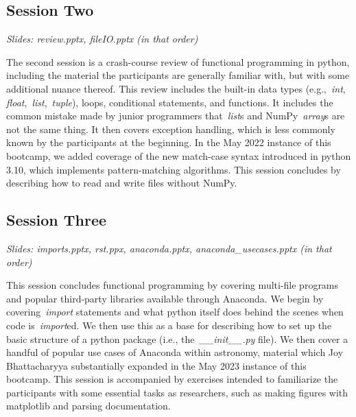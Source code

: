 \subsection{Session Two}
\label{sec:curriculum:two}
\noindent
\textit{Slides: review.pptx, fileIO.pptx (in that order)}
\par\noindent
The second session is a crash-course review of functional programming in
python, including the material the participants are generally familiar with,
but with some additional nuance thereof.
This review includes the built-in data types (e.g.,~\textit{int},
\textit{float},~\textit{list},~\textit{tuple}), loops, conditional statements,
and functions.
It includes the common mistake made by junior programmers that~\textit{list}s
and NumPy~\textit{array}s are not the same thing.
It then covers exception handling, which is less commonly known by the
participants at the beginning.
In the May 2022 instance of this bootcamp, we added coverage of the new
match-case syntax introduced in python 3.10, which implements pattern-matching
algorithms.
This session concludes by describing how to read and write files without NumPy.

\subsection{Session Three}
\label{sec:curriculum:three}
\noindent
\textit{Slides: imports.pptx, rst.ppx, anaconda.pptx, anaconda\_usecases.pptx
(in that order)}
\par\noindent
This session concludes functional programming by covering multi-file programs
and popular third-party libraries available through Anaconda.
We begin by covering~\textit{import} statements and what python itself does
behind the scenes when code is~\textit{import}ed.
We then use this as a base for describing how to set up the basic structure of
a python package (i.e., the~\textit{\_\_init\_\_.py} file).
We then cover a handful of popular use cases of Anaconda within astronomy,
material which Joy Bhattacharyya substantially expanded in the May 2023
instance of this bootcamp.
This session is accompanied by exercises intended to familiarize the
participants with some essential tasks as researchers, such as making figures
with matplotlib and parsing documentation.

